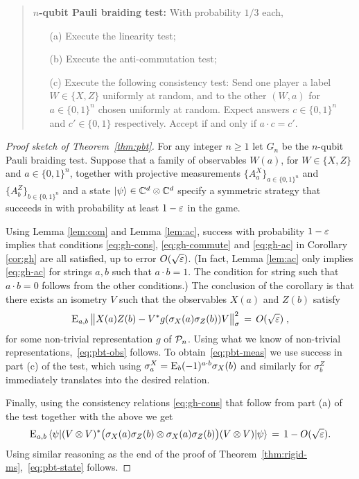 \begin{quote}
\textbf{$n$-qubit Pauli braiding test:}
With probability $1/3$ each, 
\begin{itemize}
\item[(a)] Execute the linearity test;
\item[(b)] Execute the anti-commutation test;
\item[(c)] Execute the following consistency test: Send one player a label $W\in\{X,Z\}$ uniformly at random, and to the other $(W,a)$ for $a\in\{0,1\}^n$ chosen uniformly at random. Expect answers $c \in \{0,1\}^n$ and $c'\in\{0,1\}$ respectively. Accept if and only if $a\cdot c = c'$. 
\end{itemize}
\end{quote}

\begin{proof}[Proof sketch of Theorem~\ref{thm:pbt}]
For any integer $n\geq 1$ let $G_n$ be the $n$-qubit Pauli braiding test. Suppose that a family of observables $W(a)$, for $W\in\{X,Z\}$ and $a\in\{0,1\}^n$, together with projective measurements $\{A^X_a\}_{a\in\{0,1\}^n}$ and $\{A^Z_b\}_{b\in\{0,1\}^n}$ and a state $|\psi\rangle\in\mathbb{C}^d\otimes \mathbb{C}^d$ specify a symmetric strategy that succeeds in with probability at least $1-\varepsilon$ in the game. 

Using Lemma \ref{lem:com} and Lemma \ref{lem:ac}, success with probability $1-\varepsilon$ implies that conditions \eqref{eq:gh-cons}, \eqref{eq:gh-commute} and \eqref{eq:gh-ac} in Corollary \ref{cor:gh} are all satisfied, up to error $O(\sqrt{\varepsilon})$. (In fact, Lemma \ref{lem:ac} only implies \eqref{eq:gh-ac} for strings $a,b$ such that $a\cdot b=1$. The condition for string such that $a\cdot b=0$ follows from the other conditions.) The conclusion of the corollary is that there exists an isometry $V$ such that the observables $X(a)$ and $Z(b)$ satisfy 
$$\textsc{E}_{a,b}\, \big\| X(a)Z(b) - V^*g(\sigma_X(a)\sigma_Z(b))V \big\|_\sigma^2 \,=\, O(\sqrt{\varepsilon})\;,$$
for some non-trivial representation $g$ of $\mathcal{P}_n$. Using what we know of non-trivial representations,~\eqref{eq:pbt-obs} follows. To obtain~\eqref{eq:pbt-meas} we use success in part (c) of the test, which using $\sigma^X_a = \textsc{E}_{b} (-1)^{a\cdot b} \sigma_X(b)$ and similarly for $\sigma^Z_b$ immediately translates into the desired relation. 

Finally, using the consistency relations \eqref{eq:gh-cons} that follow from part (a) of the  test together with the above we get
$$\textsc{E}_{a,b}\, \langle\psi| (V\otimes V)^* \big(  \sigma_X(a)\sigma_Z(b)\otimes  \sigma_X(a)\sigma_Z(b)\big)(V\otimes V)|\psi\rangle \,=\, 1-O(\sqrt{\varepsilon}).$$
Using similar reasoning as the end of the proof of Theorem~\ref{thm:rigid-ms},~\eqref{eq:pbt-state} follows.
\end{proof}


